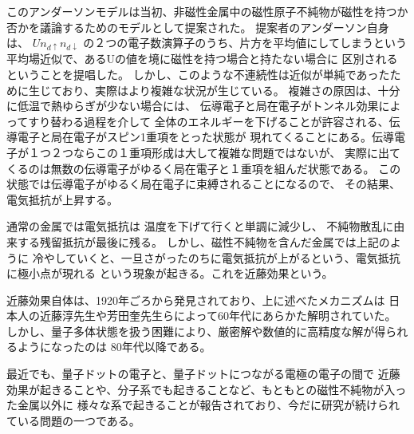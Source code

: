 \documentclass[letterpaper,10pt,dvipdfmx]{sphinxhowto}
\begin{document}
このアンダーソンモデルは当初、非磁性金属中の磁性原子不純物が磁性を持つか否かを議論するためのモデルとして提案された。
提案者のアンダーソン自身は、
\(Un_{d\uparrow}n_{d\downarrow}\)
の２つの電子数演算子のうち、片方を平均値にしてしまうという平均場近似で、あるUの値を境に磁性を持つ場合と持たない場合に
区別されるということを提唱した。
しかし、このような不連続性は近似が単純であったために生じており、実際はより複雑な状況が生じている。
複雑さの原因は、十分に低温で熱ゆらぎが少ない場合には、
伝導電子と局在電子がトンネル効果によってすり替わる過程を介して
全体のエネルギーを下げることが許容される、伝導電子と局在電子がスピン1重項をとった状態が
現れてくることにある。伝導電子が１つ２つならこの１重項形成は大して複雑な問題ではないが、
実際に出てくるのは無数の伝導電子がゆるく局在電子と１重項を組んだ状態である。
この状態では伝導電子がゆるく局在電子に束縛されることになるので、
その結果、電気抵抗が上昇する。

通常の金属では電気抵抗は
温度を下げて行くと単調に減少し、
不純物散乱に由来する残留抵抗が最後に残る。
しかし、磁性不純物を含んだ金属では上記のように
冷やしていくと、一旦さがったのちに電気抵抗が上がるという、電気抵抗に極小点が現れる
という現象が起きる。これを近藤効果という。

近藤効果自体は、1920年ごろから発見されており、上に述べたメカニズムは
日本人の近藤淳先生や芳田奎先生らによって60年代にあらかた解明されていた。
しかし、量子多体状態を扱う困難により、厳密解や数値的に高精度な解が得られるようになったのは
80年代以降である。

最近でも、量子ドットの電子と、量子ドットにつながる電極の電子の間で
近藤効果が起きることや、分子系でも起きることなど、もともとの磁性不純物が入った金属以外に
様々な系で起きることが報告されており、今だに研究が続けられている問題の一つである。
\end{document}
